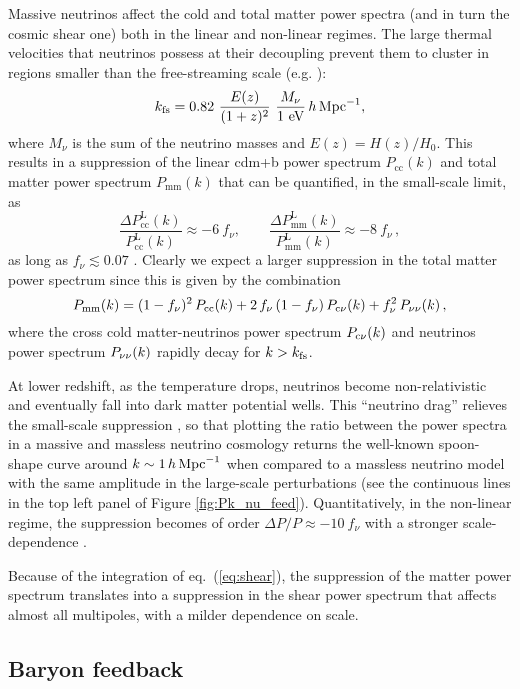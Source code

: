 \documentclass[a4paper,11pt]{article}
\newcommand{\be}{\begin{equation}}
\newcommand{\ee}{\end{equation}}
\def\kMpc{\, h \, {\rm Mpc}^{-1}}
\newcommand{\eq}[1]{eq.~(\ref{#1})}
\begin{document}
{Massive neutrinos affect the cold and total matter power spectra (and in turn the cosmic shear one) both in the linear and non-linear regimes. The large thermal velocities that neutrinos possess at their decoupling prevent them to cluster in regions smaller than the free-streaming scale (e.g. \cite{LP_massive_nu+06}):
\begin{equation}
k_{\textrm{fs}} = 0.82 \ \frac{E(z)}{(1+z)^2} \ \frac{M_\nu}{1 \unit{\ eV}}  \kMpc,
\end{equation}
where $M_\nu$ is the sum of the neutrino masses and $E(z)= H(z)/H_0$. This results in a suppression of the linear cdm+b power spectrum $P_\mathrm{cc}(k)$ and total matter power spectrum $P_\mathrm{mm}(k)$ that can be quantified, in the small-scale limit, as \cite{LP_massive_nu+06, DEMNUni+16}
\be
\frac{\Delta P_\mathrm{cc}^\mathrm L(k)}{P_\mathrm{cc}^\mathrm L(k)} \approx -6 \ f_\nu,\qquad\frac{\Delta P_\mathrm{mm}^\mathrm L(k)}{P_\mathrm{mm}^\mathrm L(k)} \approx -8 \ f_\nu\,,
\ee
as long as $f_\nu  \lesssim 0.07$ \cite{LP_massive_nu+06}.  Clearly we expect a larger suppression in the total matter power spectrum since this is given by the combination 
\be
P_{\rm mm}(k)=(1-f_\nu)^2\,P_{\rm cc}(k)+2\,f_\nu\,(1-f_\nu)\,P_{\rm c\nu}(k)+f_\nu^2\,P_{\rm \nu\nu}(k)\,,
\ee
where the cross cold matter-neutrinos power spectrum $P_{\rm c\nu}(k)$ and neutrinos power spectrum  $P_{\rm \nu\nu}(k)$  rapidly decay for $k>k_{\rm fs}$.

At lower redshift, as the temperature drops, neutrinos become non-relativistic and eventually fall into dark matter potential wells. This ``neutrino drag'' relieves the small-scale suppression \cite{Bird-HALOFIT+12}, so that plotting the ratio between the power spectra in a massive and massless neutrino cosmology returns the well-known spoon-shape curve around $k \sim 1 \kMpc$ when compared to a massless neutrino model with the same amplitude in the large-scale perturbations  (see the continuous lines in the top left panel of Figure \ref{fig:Pk_nu_feed}). Quantitatively, in the non-linear regime, the suppression becomes of order $\Delta P/P \approx -10 \ f_\nu$ with a stronger scale-dependence \cite{brandbyge08, vielhaehneltspringel2010}.

Because of the integration of \eq{eq:shear}, the suppression of the matter power spectrum translates into a suppression in the shear power spectrum that affects almost all multipoles, with a milder dependence on scale.

\subsection{Baryon feedback}

}
\end{document}
